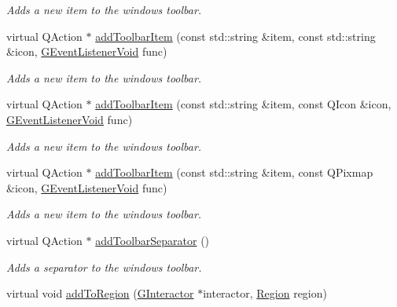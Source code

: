 \begin{DoxyCompactItemize}
\begin{DoxyCompactList}\small\item\em Adds a new item to the window\textquotesingle{}s toolbar. \end{DoxyCompactList}\item 
virtual Q\+Action $\ast$ \mbox{\hyperlink{classsgl_1_1GWindow_a2fceadd3b04b459bb16e560b095eb93d}{add\+Toolbar\+Item}} (const std\+::string \&item, const std\+::string \&icon, \mbox{\hyperlink{namespacesgl_a54427ce97bb1c2804e4fe2b0a62e8b17}{G\+Event\+Listener\+Void}} func)
\begin{DoxyCompactList}\small\item\em Adds a new item to the window\textquotesingle{}s toolbar. \end{DoxyCompactList}\item 
virtual Q\+Action $\ast$ \mbox{\hyperlink{classsgl_1_1GWindow_a1cd26d8c9004f7cbd81cecfbd323f418}{add\+Toolbar\+Item}} (const std\+::string \&item, const Q\+Icon \&icon, \mbox{\hyperlink{namespacesgl_a54427ce97bb1c2804e4fe2b0a62e8b17}{G\+Event\+Listener\+Void}} func)
\begin{DoxyCompactList}\small\item\em Adds a new item to the window\textquotesingle{}s toolbar. \end{DoxyCompactList}\item 
virtual Q\+Action $\ast$ \mbox{\hyperlink{classsgl_1_1GWindow_a6daacc5873dd3a11813a68fcf88c9d6e}{add\+Toolbar\+Item}} (const std\+::string \&item, const Q\+Pixmap \&icon, \mbox{\hyperlink{namespacesgl_a54427ce97bb1c2804e4fe2b0a62e8b17}{G\+Event\+Listener\+Void}} func)
\begin{DoxyCompactList}\small\item\em Adds a new item to the window\textquotesingle{}s toolbar. \end{DoxyCompactList}\item 
virtual Q\+Action $\ast$ \mbox{\hyperlink{classsgl_1_1GWindow_a885470a4fc1b578a76f6fddc2b1950a2}{add\+Toolbar\+Separator}} ()
\begin{DoxyCompactList}\small\item\em Adds a separator to the window\textquotesingle{}s toolbar. \end{DoxyCompactList}\item 
virtual void \mbox{\hyperlink{classsgl_1_1GWindow_aab55413917cdbb2e0560ab415d59fd1f}{add\+To\+Region}} (\mbox{\hyperlink{classsgl_1_1GInteractor}{G\+Interactor}} $\ast$interactor, \mbox{\hyperlink{classsgl_1_1GWindow_a81a01a86de31071a92e6cce0bab9bc4b}{Region}} region)

\end{DoxyCompactItemize}
